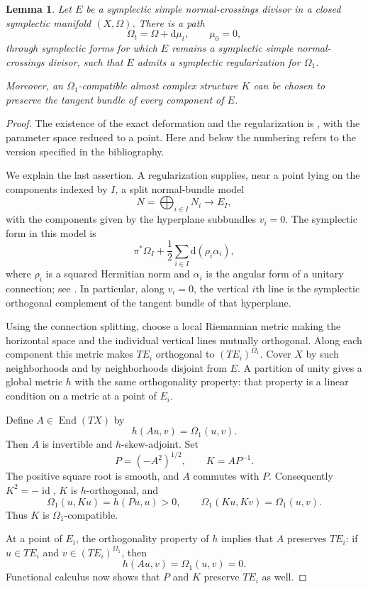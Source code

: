\documentclass[11pt]{article}
\newtheorem{lemma}[theorem]{Lemma}
\theoremstyle{definition}
\theoremstyle{remark}
\newcommand{\dd}{\mathrm d}
\newcommand{\id}{\operatorname{id}}
\newcommand{\End}{\operatorname{End}}
\begin{document}
\begin{lemma}\label{lem:regularization}
Let $E$ be a symplectic simple normal-crossings divisor in a closed
symplectic manifold $(X,\Omega)$.  There is a path
\[
\Omega_t=\Omega+\dd\mu_t,\qquad \mu_0=0,
\]
through symplectic forms for which $E$ remains a symplectic simple
normal-crossings divisor, such that $E$ admits a symplectic
regularization for $\Omega_1$.

Moreover, an $\Omega_1$-compatible almost complex structure $K$ can
be chosen to preserve the tangent bundle of every component of $E$.
\end{lemma}

\begin{proof}
The existence of the exact deformation and the regularization is
\cite[Theorem~2.13]{TMZ}, with the parameter space reduced to a point.
Here and below the numbering refers to the version specified in the
bibliography.

We explain the last assertion.  A regularization supplies, near a
point lying on the components indexed by $I$, a split normal-bundle
model
\[
N=\bigoplus_{i\in I}N_i\longrightarrow E_I,
\]
with the components given by the hyperplane subbundles $v_i=0$.
The symplectic form in this model is
\[
\pi^*\Omega_I+\frac12\sum_{i\in I}\dd(\rho_i\alpha_i),
\]
where $\rho_i$ is a squared Hermitian norm and $\alpha_i$ is the
angular form of a unitary connection; see \cite[Section~2.2]{TMZ}.
In particular, along $v_i=0$, the vertical $i$th line is the
symplectic orthogonal complement of the tangent bundle of that
hyperplane.

Using the connection splitting, choose a local Riemannian metric
making the horizontal space and the individual vertical lines
mutually orthogonal.  Along each component this metric makes
$TE_i$ orthogonal to $(TE_i)^{\Omega_1}$.  Cover $X$ by such
neighborhoods and by neighborhoods disjoint from $E$.  A partition
of unity gives a global metric $h$ with the same orthogonality
property: that property is a linear condition on a metric at a
point of $E_i$.

Define $A\in\End(TX)$ by
\[
h(Au,v)=\Omega_1(u,v).
\]
Then $A$ is invertible and $h$-skew-adjoint.  Set
\[
P=(-A^2)^{1/2},\qquad K=AP^{-1}.
\]
The positive square root is smooth, and $A$ commutes with $P$.
Consequently $K^2=-\id$, $K$ is $h$-orthogonal, and
\[
\Omega_1(u,Ku)=h(Pu,u)>0,\qquad
\Omega_1(Ku,Kv)=\Omega_1(u,v).
\]
Thus $K$ is $\Omega_1$-compatible.

At a point of $E_i$, the orthogonality property of $h$ implies that
$A$ preserves $TE_i$: if $u\in TE_i$ and
$v\in(TE_i)^{\Omega_1}$, then
\[
h(Au,v)=\Omega_1(u,v)=0.
\]
Functional calculus now shows that $P$ and $K$ preserve $TE_i$
as well.
\end{proof}
\end{document}
